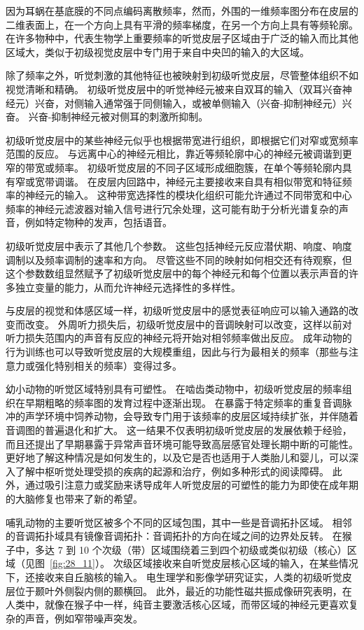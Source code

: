 因为耳蜗在基底膜的不同点编码离散频率，然而，外围的一维频率图分布在皮层的二维表面上，在一个方向上具有平滑的频率梯度，在另一个方向上具有等频轮廓。
在许多物种中，代表生物学上重要频率的听觉皮层子区域由于广泛的输入而比其他区域大，类似于初级视觉皮层中专门用于来自中央凹的输入的大区域。


除了频率之外，听觉刺激的其他特征也被映射到初级听觉皮层，尽管整体组织不如视觉清晰和精确。
初级听觉皮层中的听觉神经元被来自双耳的输入（双耳兴奋神经元）兴奋，对侧输入通常强于同侧输入，或被单侧输入（兴奋-抑制神经元）兴奋。
兴奋-抑制神经元被对侧耳的刺激所抑制。


初级听觉皮层中的某些神经元似乎也根据带宽进行组织，即根据它们对窄或宽频率范围的反应。
与远离中心的神经元相比，靠近等频轮廓中心的神经元被调谐到更窄的带宽或频率。
初级听觉皮层的不同子区域形成细胞簇，在单个等频轮廓内具有窄或宽带调谐。
在皮层内回路中，神经元主要接收来自具有相似带宽和特征频率的神经元的输入。
这种带宽选择性的模块化组织可能允许通过不同带宽和中心频率的神经元滤波器对输入信号进行冗余处理，这可能有助于分析光谱复杂的声音，例如特定物种的发声，包括语音。


初级听觉皮层中表示了其他几个参数。
这些包括神经元反应潜伏期、响度、响度调制以及频率调制的速率和方向。
尽管这些不同的映射如何相交还有待观察，但这个参数数组显然赋予了初级听觉皮层中的每个神经元和每个位置以表示声音的许多独立变量的能力，从而允许神经元选择性的多样性。


与皮层的视觉和体感区域一样，初级听觉皮层中的感觉表征响应可以输入通路的改变而改变。
外周听力损失后，初级听觉皮层中的音调映射可以改变，这样以前对听力损失范围内的声音有反应的神经元将开始对相邻频率做出反应。
成年动物的行为训练也可以导致听觉皮层的大规模重组，因此与行为最相关的频率（那些与注意力或强化特别相关的频率）变得过多\cite{zhang2001persistent,merzenich1975representation}。


幼小动物的听觉区域特别具有可塑性。
在啮齿类动物中，初级听觉皮层的频率组织在早期粗略的频率图的发育过程中逐渐出现。
在暴露于特定频率的重复音调脉冲的声学环境中饲养动物，会导致专门用于该频率的皮层区域持续扩张，并伴随着音调图的普遍退化和扩大。
这一结果不仅表明初级听觉皮层的发展依赖于经验，而且还提出了早期暴露于异常声音环境可能导致高层感官处理长期中断的可能性。
更好地了解这种情况是如何发生的，以及它是否也适用于人类胎儿和婴儿，可以深入了解中枢听觉处理受损的疾病的起源和治疗，例如多种形式的阅读障碍。
此外，通过吸引注意力或奖励来诱导成年人听觉皮层的可塑性的能力为即使在成年期的大脑修复也带来了新的希望。


哺乳动物的主要听觉区被多个不同的区域包围，其中一些是音调拓扑区域。
相邻的音调拓扑域具有镜像音调拓扑：音调拓扑的方向在域之间的边界处反转。
在猴子中，多达 7 到 10 个次级（带）区域围绕着三到四个初级或类似初级（核心）区域（见图~\ref{fig:28_11}）。
次级区域接收来自听觉皮层核心区域的输入，在某些情况下，还接收来自丘脑核的输入。
电生理学和影像学研究证实，人类的初级听觉皮层位于颞叶外侧裂内侧的颞横回。
此外，最近的功能性磁共振成像研究表明，在人类中，就像在猴子中一样，纯音主要激活核心区域，而带区域的神经元更喜欢复杂的声音，例如窄带噪声突发。




